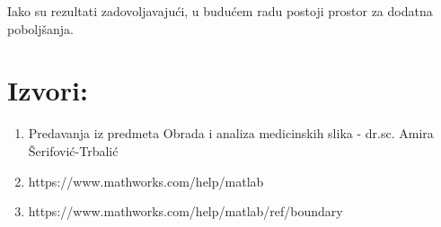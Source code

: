 \documentclass[a4paper,12pt]{article}
\begin{document}
Iako su rezultati zadovoljavajući, u budućem radu postoji prostor za dodatna poboljšanja.

\newpage
\section{Izvori:}

\begin{enumerate}
	\item Predavanja iz predmeta Obrada i analiza medicinskih slika  - dr.sc. Amira Šerifović-Trbalić
	\item https://www.mathworks.com/help/matlab
	\item https://www.mathworks.com/help/matlab/ref/boundary
\end{enumerate}
\end{document}

